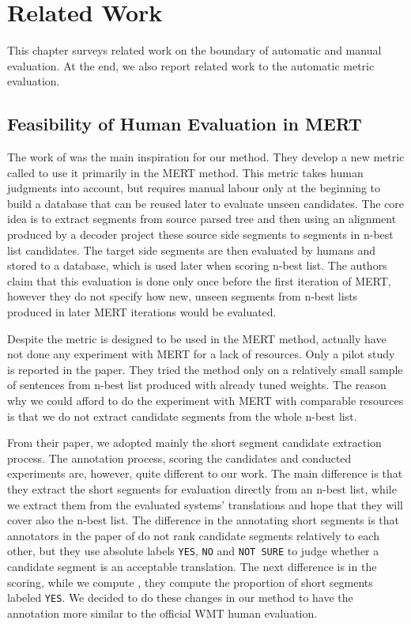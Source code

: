 \chapter{Related Work}
\label{chapter:related}

This chapter surveys related work on the boundary of automatic and manual
evaluation. At the end, we also report related work to the automatic metric
evaluation.

\section{Feasibility of Human Evaluation in MERT}

The work of  was the main inspiration for our
 method. They develop a new metric called  to use
it primarily in the MERT method. This metric takes human judgments into
account, but requires manual labour only at the beginning to build a database
that can be reused later to evaluate unseen candidates. The core idea is to
extract segments from source parsed tree and then using an alignment produced
by a decoder project these source side segments to segments in n-best list
candidates.  The target side segments are then evaluated by humans and stored
to a database, which is used later when scoring n-best list. The authors claim
that this evaluation is done only once before the first iteration of MERT,
however they do not specify how new, unseen segments from n-best lists produced
in later MERT iterations would be evaluated.

Despite the  metric is designed to be used in the MERT method,
 actually have not done any experiment with MERT
for a lack of resources. Only a pilot study is reported in the paper. They
tried the method only on a relatively small sample of sentences from n-best
list produced with already tuned weights. The reason why we could afford to do
the experiment with MERT with comparable resources is that we do not extract
candidate segments from the whole n-best list.

From their paper, we adopted mainly the short segment candidate extraction
process. The annotation process, scoring the candidates and conducted
experiments are, however, quite different to our work. The main difference is
that they extract the short segments for evaluation directly from an n-best
list, while we extract them from the evaluated systems' translations and hope
that they will cover also the n-best list. The difference in the annotating
short segments is that annotators in the paper of 
do not rank candidate segments relatively to each other, but they use absolute
labels \texttt{YES}, \texttt{NO} and \texttt{NOT SURE} to judge whether a
candidate segment is an acceptable translation. The next difference is in the
scoring, while we compute , they compute
the proportion of short segments labeled \texttt{YES}.  We decided to do these
changes in our method to have the annotation more similar to the official WMT
human evaluation.

